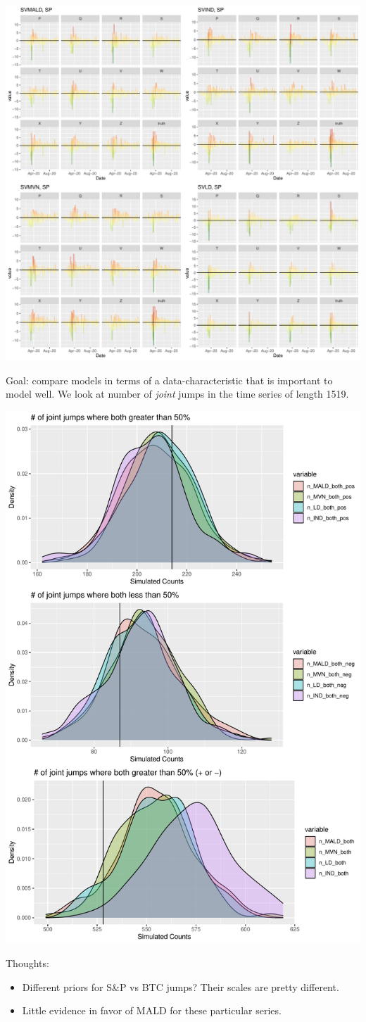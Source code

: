 \documentclass{article}\usepackage[]{graphicx}\usepackage[]{color}
\begin{document}
\includegraphics[width = .9\linewidth]{"lineup_SP.pdf"}

\newpage
\clearpage
Goal: compare models in terms of a data-characteristic that is important to model well. We look at number of \textit{joint} jumps in the time series of length 1519.


\includegraphics[width = .75\linewidth]{"ppp_joint_jumps.pdf"}

Thoughts:
\begin{itemize}
\item Different priors for S\&P vs BTC jumps? Their scales are pretty different.
\item Little evidence in favor of MALD for these particular series. 
\end{itemize}
\end{document}
